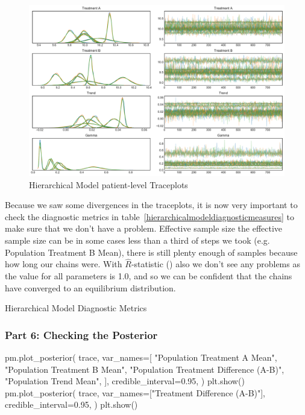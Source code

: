 \documentclass[12pt,a4paper,leqno]{report}
\theoremstyle{plain}
\theoremstyle{definition}
\theoremstyle{remark}
\begin{document}
\bigskip
\begin{figure}[H]
    \caption{Hierarchical Model patient-level Traceplots}\label{hierarchicalmodelpatienttraceplots}
    \bigskip
    \includegraphics[width=\textwidth,height=\textheight,keepaspectratio]{hierarchical_model_patient_level_traceplot.pdf}
\end{figure}
\bigskip

Because we saw some divergences in the traceplots, it is now very important to
check the diagnostic metrics in table\ \ref{hierarchicalmodeldiagnosticmeasures} to make
sure that we don't have a problem. Effective sample size  the effective
sample size can be in some cases less than a third of steps we took (e.g. Population
Treatment B Mean), there is still plenty enough of samples because how long our chains were. With
\(\hat{R}\)-statistic () also we don't see any problems as
the value for all parameters is 1.0, and so we can be confident that the chains have converged to
an equilibrium distribution.

\bigskip
\begin{table}[H]
    \caption{Hierarchical Model Diagnostic Metrics}\label{hierarchicalmodeldiagnosticmeasures}
    \bigskip
    \centering
    \resizebox{!}{3.2in}{%
    
    }
\end{table}
\smallskip

\subsubsection*{Part 6: Checking the Posterior}

\bigskip
\begin{pyverbatim}[][fontsize=\footnotesize]
    pm.plot_posterior(
        trace,
        var_names=[
            "Population Treatment A Mean",
            "Population Treatment B Mean",
            "Population Treatment Difference (A-B)",
            "Population Trend Mean",
        ],
        credible_interval=0.95,
    )
    plt.show()
    pm.plot_posterior(
        trace,
        var_names=["Treatment Difference (A-B)"],
        credible_interval=0.95,
    )
    plt.show()
\end{pyverbatim}
\smallskip
\end{document}
